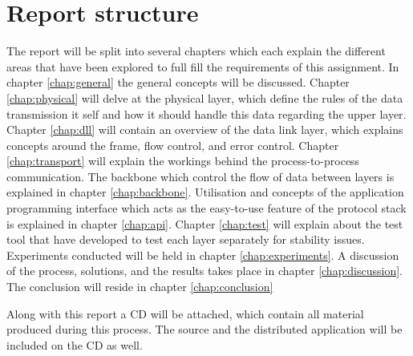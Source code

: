 \section{Report structure}
The report will be split into several chapters which each explain the different areas that have been explored to full fill the requirements of this assignment. In chapter \ref{chap:general} the general concepts will be discussed. Chapter \ref{chap:physical} will delve at the physical layer, which define the rules of the data transmission it self and how it should handle this data regarding the upper layer. Chapter \ref{chap:dll} will contain an overview of the data link layer, which explains concepts around the frame, flow control, and error control. Chapter \ref{chap:transport} will explain the workings behind the process-to-process communication. The backbone which control the flow of data between layers is explained in chapter \ref{chap:backbone}. Utilisation and concepts of the application programming interface which acts as the easy-to-use feature of the protocol stack is explained in chapter \ref{chap:api}. Chapter \ref{chap:test} will explain about the test tool that have developed to test each layer separately for stability issues. Experiments conducted will be held in chapter \ref{chap:experiments}. A discussion of the process, solutions, and the results takes place in chapter \ref{chap:discussion}. The conclusion will reside in chapter \ref{chap:conclusion}

Along with this report a CD will be attached, which contain all material produced during this process. The source and the distributed application will be included on the CD as well.